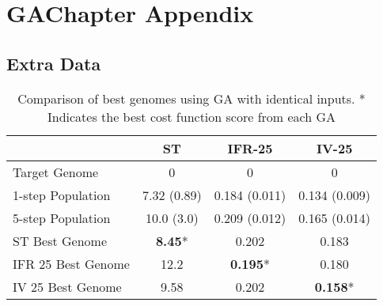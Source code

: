 
\section{GAChapter Appendix}\label{sec:GA:chapter-5-appendix}

\subsection{Extra Data}

\begin{table}[htp]
  \centering
  \caption{Comparison of best genomes using GA with
    identical inputs. * Indicates the best cost function score from
    each GA}\label{tab:GA:4}
  \begin{tabular}{lccc}
\toprule
                   &       ST       &     IFR-25      & IV-25 \\
\midrule
  Target Genome    &       0        &        0        & 0 \\ %
1-step Population  &  7.32 (0.89)   &  0.184 (0.011)  & 0.134 (0.009)\\ %
5-step Population  &   10.0 (3.0)   &  0.209 (0.012)  & 0.165 (0.014) \\ %
 ST Best Genome    & \textbf{8.45}* &      0.202      & 0.183 \\ %
IFR 25 Best Genome  &      12.2      & \textbf{0.195}* & 0.180 \\ %
IV 25 Best Genome  &      9.58      &      0.202      & \textbf{0.158}* \\ %
\bottomrule
\end{tabular}
\end{table}


